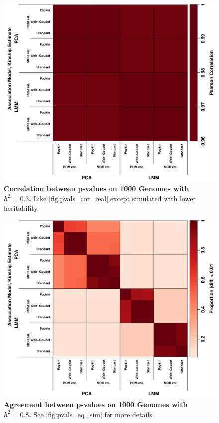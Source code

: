 \documentclass[11pt]{article}
\begin{document}
\begin{figure}[bp!]
  \centering
  \includegraphics[width=\textwidth]{tgp-nygc-autosomes_ld_prune_1000kb_0.3_maf-0.01/h-0.3/pvals_cor.pdf}
  \caption{
    {\bf Correlation between p-values on 1000 Genomes with $h^2=0.3$.}
    Like \cref{fig:pvals_cor_real} except simulated with lower heritability.
  }
  \label{fig:pvals_cor_real-h3}
\end{figure}

\begin{figure}[bp!]
  \centering
  \includegraphics[width=\textwidth]{tgp-nygc-autosomes_ld_prune_1000kb_0.3_maf-0.01/pvals_eq.pdf}
  \caption{
    {\bf Agreement between p-values on 1000 Genomes with $h^2=0.8$.}
    See \cref{fig:pvals_eq_sim} for more details.
  }
  \label{fig:pvals_eq_real}
\end{figure}
\end{document}
